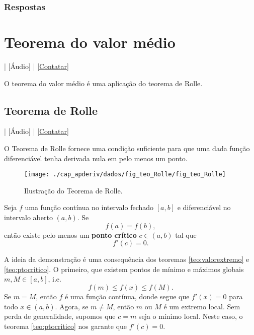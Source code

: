 \ifisbook
\subsubsection{Respostas}
\shipoutAnswer
\fi


\section{Teorema do valor médio}\label{cap_apderiv_sec_valormedio}

\begin{flushright}
  [Vídeo] | [Áudio] | \href{https://phkonzen.github.io/notas/contato.html}{[Contatar]}
\end{flushright}

O teorema do valor médio é uma aplicação do teorema de Rolle.

\subsection{Teorema de Rolle}

\begin{flushright}
  [Vídeo] | [Áudio] | \href{https://phkonzen.github.io/notas/contato.html}{[Contatar]}
\end{flushright}

O Teorema de Rolle fornece uma condição suficiente para que uma dada função diferenciável tenha derivada nula em pelo menos um ponto.

\begin{figure}[H]
  \centering
  \texttt{[image: ./cap\_apderiv/dados/fig\_teo\_Rolle/fig\_teo\_Rolle]}
  \caption{Ilustração do Teorema de Rolle.}
  \label{fig:teo_Rolle}
\end{figure}

\begin{teo}
  Seja $f$ uma função contínua no intervalo fechado $[a, b]$ e diferenciável no intervalo aberto $(a, b)$. Se
  \begin{equation}
    f(a)=f(b),
  \end{equation}
  então existe pelo menos um {\bf ponto crítico} $c\in (a, b)$ tal que
  \begin{equation}
    f'(c)=0.
  \end{equation}
\end{teo}
\begin{dem}
  A ideia da demonstração é uma consequência dos teoremas \ref{teo:valorextremo} e \ref{teo:ptocritico}. O primeiro, que existem pontos de mínimo e máximos globais  $m, M\in [a, b]$, i.e.
  \begin{equation}
    f(m) \leq f(x) \leq f(M).
  \end{equation}
  Se $m=M$, então $f$ é uma função contínua, donde segue que $f'(x)=0$ para todo $x\in (a, b)$. Agora, se $m\neq M$, então $m$ ou $M$ é um extremo local. Sem perda de generalidade, supomos que $c = m$ seja o mínimo local. Neste caso, o teorema \ref{teo:ptocritico} nos garante que $f'(c)=0$.
\end{dem}

